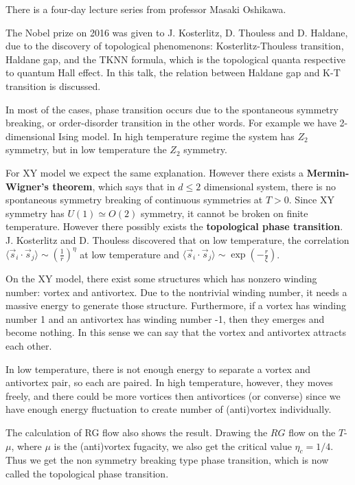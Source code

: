 There is a four-day lecture series from professor Masaki Oshikawa.

The Nobel prize on 2016 was given to J. Kosterlitz, D. Thouless and D. Haldane, due to the discovery of topological phenomenons: Kosterlitz-Thouless transition, Haldane gap, and the TKNN formula, which is the topological quanta respective to quantum Hall effect. In this talk, the relation between Haldane gap and K-T transition is discussed.

In most of the cases, phase transition occurs due to the spontaneous symmetry breaking, or order-disorder transition in the other words. For example we have 2-dimensional Ising model. In high temperature regime the system has $Z_2$ symmetry, but in low temperature the $Z_2$ symmetry.

For XY model we expect the same explanation. However there exists a \textbf{Mermin-Wigner's theorem}, which says that in $d\leq 2$ dimensional system, there is no spontaneous symmetry breaking of continuous symmetries at $T>0$. Since XY symmetry has $U(1)\simeq O(2)$ symmetry, it cannot be broken on finite temperature. However there possibly exists the \textbf{topological phase transition}. J. Kosterlitz and D. Thouless discovered that on low temperature, the correlation $\langle \vec{s}_i\cdot \vec{s}_j\rangle\sim \left(\frac{1}{r}\right)^{\eta}$ at low temperature and $\langle \vec{s}_i\cdot \vec{s}_j\rangle\sim \exp{\left(-\frac{r}{\xi}\right)}$. 

On the XY model, there exist some structures which has nonzero winding number: vortex and antivortex. Due to the nontrivial winding number, it needs a massive energy to generate those structure. Furthermore, if a vortex has winding number 1 and an antivortex has winding number -1, then they emerges and become nothing. In this sense we can say that the vortex and antivortex attracts each other.

In low temperature, there is not enough energy to separate a vortex and antivortex pair, so each are paired. In high temperature, however, they moves freely, and there could be more vortices then antivortices (or converse) since we have enough energy fluctuation to create number of (anti)vortex individually.

The calculation of RG flow also shows the result. Drawing the $RG$ flow on the $T$-$\mu$, where $\mu$ is the (anti)vortex fugacity, we also get the critical value $\eta_c=1/4$. Thus we get the non symmetry breaking type phase transition, which is now called the topological phase transition.

